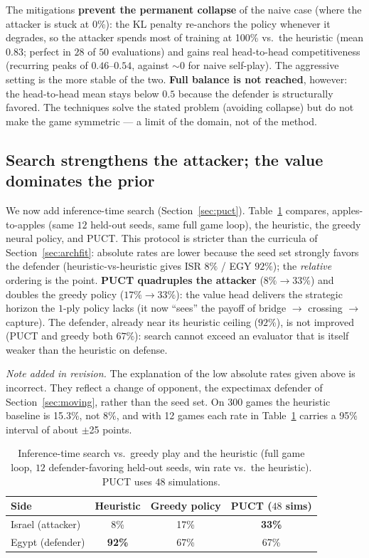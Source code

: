 \documentclass{article}
\begin{document}
The mitigations \textbf{prevent the permanent collapse} of the naive case (where the
attacker is stuck at 0\%): the KL penalty re-anchors the policy whenever it degrades, so
the attacker spends most of training at 100\% vs.\ the heuristic (mean $0.83$; perfect in
$28$ of $50$ evaluations) and gains real head-to-head competitiveness (recurring peaks of
$0.46$--$0.54$, against $\sim$0 for naive self-play). The aggressive setting is the more
stable of the two. \textbf{Full balance is not reached}, however: the head-to-head mean
stays below $0.5$ because the defender is structurally favored. The techniques solve the
stated problem (avoiding collapse) but do not make the game symmetric --- a limit of the
domain, not of the method.

\subsection{Search strengthens the attacker; the value dominates the prior}
\label{sec:puctres}
We now add inference-time search (Section~\ref{sec:puct}). Table~\ref{tab:puct} compares,
apples-to-apples (same $12$ held-out seeds, same full game loop), the heuristic, the
greedy neural policy, and PUCT. This protocol is stricter than the curricula of
Section~\ref{sec:archfit}: absolute rates are lower because the seed set strongly favors
the defender (heuristic-vs-heuristic gives ISR $8\%$ / EGY $92\%$); the \emph{relative}
ordering is the point. \textbf{PUCT quadruples the attacker} ($8\%\!\to\!33\%$) and doubles
the greedy policy ($17\%\!\to\!33\%$): the value head delivers the strategic horizon the
$1$-ply policy lacks (it now ``sees'' the payoff of bridge $\to$ crossing $\to$ capture).
The defender, already near its heuristic ceiling ($92\%$), is not improved (PUCT and greedy
both $67\%$): search cannot exceed an evaluator that is itself weaker than the heuristic on
defense.

\emph{Note added in revision.} The explanation of the low absolute rates given above is
incorrect. They reflect a change of opponent, the expectimax defender of
Section~\ref{sec:moving}, rather than the seed set. On 300 games the heuristic baseline
is 15.3\%, not 8\%, and with 12 games each rate in Table~\ref{tab:puct} carries a 95\%
interval of about $\pm$25 points.

\begin{table}[t]
\centering
\caption{Inference-time search vs.\ greedy play and the heuristic (full game loop, $12$
defender-favoring held-out seeds, win rate vs.\ the heuristic). PUCT uses $48$ simulations.}
\label{tab:puct}
\begin{tabular}{lccc}
\toprule
\textbf{Side} & \textbf{Heuristic} & \textbf{Greedy policy} & \textbf{PUCT ($48$ sims)} \\
\midrule
Israel (attacker) & 8\% & 17\% & \textbf{33\%} \\
Egypt (defender)  & \textbf{92\%} & 67\% & 67\% \\
\bottomrule
\end{tabular}
\end{table}
\end{document}

